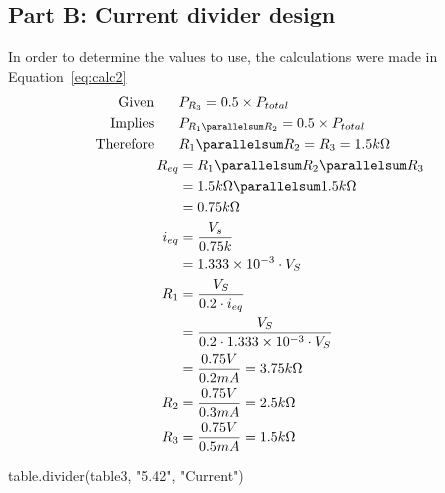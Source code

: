 {{{{{\subsection{Part B: Current divider design}
\label{sub:resultsB}
In order to determine the values to use, the calculations were made in Equation~\ref{eq:calc2}
\begin{equation}\label{eq:calc2}
 \begin{split}
   \text{Given } \hspace{0.5cm} & P_{R_3} = 0.5\times P_{total} \\
   \text{Implies } \hspace{0.5cm} & P_{R_1 \parallelsum R_2} = 0.5\times P_{total}\\
   \text{Therefore } \hspace{0.5cm} & R_1 \parallelsum R_2 = R_3 = 1.5 k\Omega \\
   R_{eq} & = R_1 \parallelsum R_2 \parallelsum R_3\\
   & = 1.5 k\Omega \parallelsum 1.5 k\Omega \\
   & = 0.75 k\Omega \\
   i_{eq} & = \frac{V_s}{0.75 k}  \\
   & = 1.333\times 10^{-3}  \cdot V_S \\
   R_1 & = \frac{V_S}{0.2 \cdot i_{eq}} \\
   & = \frac{V_S}{0.2 \cdot 1.333\times 10^{-3}  \cdot V_S} \\
   & = \frac{0.75 V}{0.2 mA} = 3.75 k\Omega \\
   R_2 & = \frac{0.75 V}{0.3 mA} = 2.5 k\Omega \\
   R_3 & = \frac{0.75 V}{0.5 mA} = 1.5 k\Omega \\
 \end{split}
\end{equation}

{{ table.divider(table3, "5.42", "Current") }}
}}}}}
